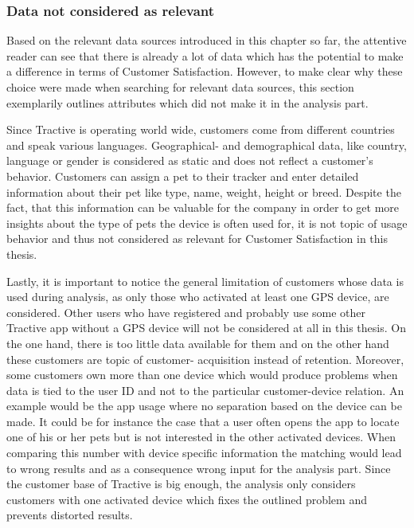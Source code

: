 \subsubsection{Data not considered as relevant}
\label{sssec:excludedData}
Based on the relevant data sources introduced in this chapter so far, the attentive reader can see that there is already a lot of data which has the potential to make a difference in terms of Customer Satisfaction. However, to make clear why these choice were made when searching for relevant data sources, this section exemplarily outlines attributes which did not make it in the analysis part. 

Since Tractive is operating world wide, customers come from different countries and speak various languages. Geographical- and demographical data, like country, language or gender is considered as static and does not reflect a customer's behavior. Customers can assign a pet to their tracker and enter detailed information about their pet like type, name, weight, height or breed. Despite the fact, that this information can be valuable for the company in order to get more insights about the type of pets the device is often used for, it is not topic of usage behavior and thus not considered as relevant for Customer Satisfaction in this thesis. 

Lastly, it is important to notice the general limitation of customers whose data is used during analysis, as only those who activated at least one GPS device, are considered. Other users who have registered and probably use some other Tractive app without a GPS device will not be considered at all in this thesis. On the one hand, there is too little data available for them and on the other hand these customers are topic of customer- acquisition instead of retention. Moreover, some customers own more than one device which would produce problems when data is tied to the user ID and not to the particular customer-device relation. An example would be the app usage where no separation based on the device can be made. It could be for instance the case that a user often opens the app to locate one of his or her pets but is not interested in the other activated devices. When comparing this number with device specific information the matching would lead to wrong results and as a consequence wrong input for the analysis part. Since the customer base of Tractive is big enough, the analysis only considers customers with one activated device which fixes the outlined problem and prevents distorted results. 

